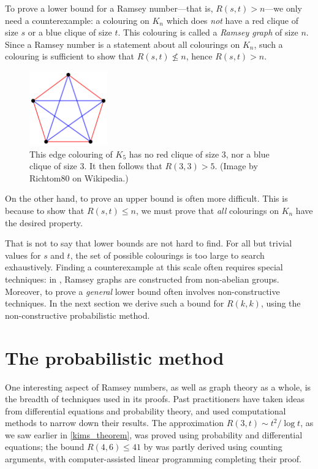 \documentclass{article}
\begin{document}
To prove a lower bound for a Ramsey number---that is, $R(s,t) > n$---we only need a counterexample: a colouring on $K_n$ which does \emph{not} have a red clique of size $s$ or a blue clique of size $t$. This colouring is called a \textit{Ramsey graph} of size $n$. Since a Ramsey number is a statement about all colourings on $K_n$, such a colouring is sufficient to show that $R(s,t) \nleq n$, hence $R(s,t) > n$.

\begin{figure}
    \centering
    \includegraphics[width=0.3\textwidth]{RamseyTheory_K5_no_mono_K3.png}
    \caption{This edge colouring of $K_5$ has no red clique of size 3, nor a blue clique of size 3. It then follows that $R(3,3) > 5$. (Image by Richtom80 on Wikipedia.)}
\end{figure}

On the other hand, to prove an upper bound is often more difficult. This is because to show that $R(s,t) \leq n$, we must prove that \emph{all} colourings on $K_n$ have the desired property.

That is not to say that lower bounds are not hard to find. For all but trivial values for $s$ and $t$, the set of possible colourings is too large to search exhaustively. Finding a counterexample at this scale often requires special techniques: in \citet{exoo2004some}, Ramsey graphs are constructed from non-abelian groups. Moreover, to prove a \emph{general} lower bound often involves non-constructive techniques. In the next section we derive such a bound for $R(k,k)$, using the non-constructive probabilistic method.

\section{The probabilistic method}

\label{probabilistic_method}

One interesting aspect of Ramsey numbers, as well as graph theory as a whole, is the breadth of techniques used in its proofs. Past practitioners have taken ideas from differential equations and probability theory, and used computational methods to narrow down their results. The approximation $R(3,t) \sim t^2/\log t$, as we saw earlier in \cref{kims_theorem}, was proved using probability and differential equations; the bound $R(4,6) \leq 41$ by \citet{mckay1997subgraph} was partly derived using counting arguments, with computer-assisted linear programming completing their proof.
\end{document}
